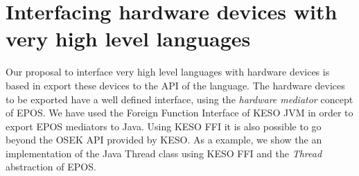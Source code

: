 \documentclass[12pt]{article} %
\begin{document}
%
\section{Interfacing hardware devices with very high level languages}
\label{sec:proposal}
Our proposal to interface very high level languages with hardware devices is based in export these devices to the API of the language. The hardware devices to be exported have a well defined interface, using the \emph{hardware mediator} concept of EPOS. We have used the Foreign Function Interface of KESO JVM in order to export EPOS mediators to Java. Using KESO FFI it is also possible to go beyond the OSEK API provided by KESO. As a example, we show the an implementation of the Java Thread class using KESO FFI and the \emph{Thread} abstraction of EPOS.
\end{document}
